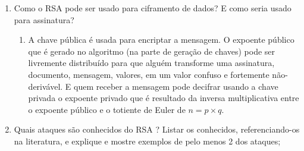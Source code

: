 \documentclass[conference]{IEEEtran}
\begin{document}
\begin{enumerate}
  \item Como o RSA pode ser usado para ciframento de dados? E como seria usado
  para assinatura?

    \begin{enumerate}
      \item A chave pública é usada para encriptar a mensagem. O expoente
      público que é gerado no algoritmo (na parte de geração de chaves) pode ser
      livremente distribuído para que alguém transforme uma assinatura,
      documento, mensagem, valores, em um valor confuso e fortemente
      não-derivável. E quem receber a mensagem pode decifrar usando a chave
      privada o expoente privado que é resultado da inversa multiplicativa entre
      o expoente público e o totiente de Euler de $n = p \times q$.
    \end{enumerate}

  \item Quais ataques são conhecidos do RSA ? Listar os conhecidos,
  referenciando-os na literatura, e explique e mostre exemplos de pelo menos 2
  dos ataques;


\end{enumerate}
\end{document}
